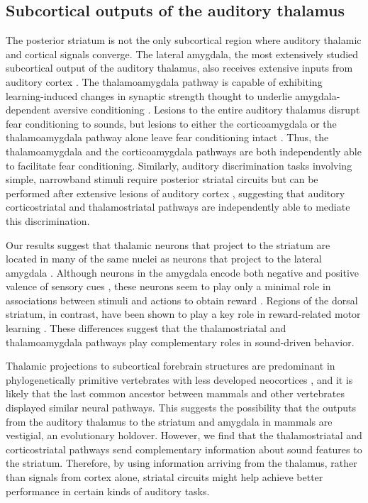\subsection{Subcortical outputs of the auditory thalamus}
%
The posterior striatum is not the only subcortical region where auditory thalamic and cortical signals converge.
%
The lateral amygdala, the most extensively studied subcortical output of the auditory thalamus, also receives extensive inputs from auditory cortex \citep{Ledoux2000}.
%
%
The thalamoamygdala pathway is capable of exhibiting learning-induced changes in synaptic strength thought to underlie amygdala-dependent aversive conditioning \citep{McKernan1997}.
% 
Lesions to the entire auditory thalamus disrupt fear conditioning to sounds, but lesions to either the corticoamygdala or the thalamoamygdala pathway alone leave fear conditioning intact \citep{Ledoux1983, Romanski1992}.
% 
Thus, the thalamoamygdala and the corticoamygdala pathways are both independently able to facilitate fear conditioning. 
%
Similarly, auditory discrimination tasks involving simple, narrowband stimuli require posterior striatal circuits \citep{Guo2018} but can be performed after extensive lesions of auditory cortex \citep{Gimenez2015}, suggesting that auditory corticostriatal and thalamostriatal pathways are independently able to mediate this discrimination. 

Our results suggest that thalamic neurons that project to the striatum are located in many of the same nuclei as neurons that project to the lateral amygdala \citep{Doron1999}. 
%
Although neurons in the amygdala encode both negative and positive valence of sensory cues \citep{Tye2008}, these neurons seem to play only a minimal role in associations between stimuli and actions to obtain reward \citep{Baxter2002}. 
%
Regions of the dorsal striatum, in contrast, have been shown to play a key role in reward-related motor learning \citep{Wickens2003, Balleine2007}.
% 
These differences suggest that the thalamostriatal and thalamoamygdala pathways play complementary roles in sound-driven behavior. 

%
Thalamic projections to subcortical forebrain structures are predominant in phylogenetically primitive vertebrates with less developed neocortices \citep{Ebner1969, Kudo1986}, and it is likely that the last common ancestor between mammals and other vertebrates displayed similar neural pathways. 
%
This suggests the possibility that the outputs from the auditory thalamus to the striatum and amygdala in mammals are vestigial, an evolutionary holdover. 
%
However, we find that the thalamostriatal and corticostriatal pathways send complementary information about sound features to the striatum. 
%
Therefore, by using information arriving from the thalamus, rather than signals from cortex alone, striatal circuits might help achieve better performance in certain kinds of auditory tasks.

